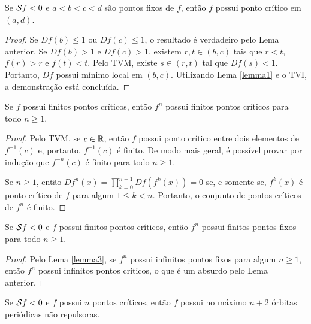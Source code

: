 \begin{lemma}
Se $\mathcal{S} f < 0$ e $a<b<c<d$ são pontos fixos de $f$, então $f$ possui ponto crítico em $(a,d)$.
\end{lemma}

\begin{proof}
Se $D f(b) \leq 1$ ou $D f(c) \leq 1$, o resultado é verdadeiro pelo Lema anterior.
Se $D f(b) > 1$ e $D f(c) > 1$, existem $r, t \in (b,c)$ tais que $r<t$, $f(r) > r$ e $f(t) < t$.
Pelo TVM, existe $s \in (r,t)$ tal que $D f(s) < 1$.
Portanto, $D f$ possui mínimo local em $(b,c)$.
Utilizando Lema \ref{lemma1} e o TVI, a demonstração está concluída.
\end{proof}

\begin{lemma}
Se $f$ possui finitos pontos críticos, então $f^n$ possui finitos pontos críticos para todo $n \geq 1$.
\end{lemma}
\begin{proof}
Pelo TVM, se $c \in \mathbb{R}$, então $f$ possui ponto crítico entre dois elementos de $f^{-1}(c)$ e, portanto, $f^{-1}(c)$ é finito.
De modo mais geral, é possível provar por indução que $f^{-n}(c)$ é finito para todo $n \geq 1$.

Se $n \geq 1$, então $D f^n(x) = \prod_{k=0}^{n-1} D f(f^k(x)) = 0$ se, e somente se, $f^k(x)$ é ponto crítico de $f$ para algum $1 \leq k < n$.
Portanto, o conjunto de pontos críticos de $f^n$ é finito.
\end{proof}

\begin{lemma}
Se $\mathcal{S} f < 0$ e $f$ possui finitos pontos críticos, então $f^n$ possui finitos pontos fixos para todo $n \geq 1$.
\end{lemma}

\begin{proof}
Pelo Lema \ref{lemma3}, se $f^n$ possui infinitos pontos fixos para algum $n \geq 1$, então $f^n$ possui infinitos pontos críticos, o que é um absurdo pelo Lema anterior.
\end{proof}

\begin{theorem}[Singer]
Se $\mathcal{S} f < 0$ e $f$ possui $n$ pontos críticos, então $f$ possui no máximo $n+2$ órbitas periódicas não repulsoras.
\end{theorem}

